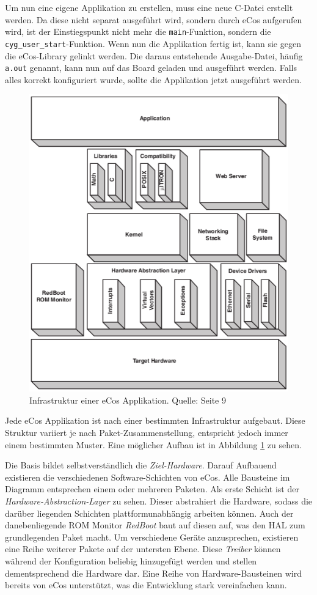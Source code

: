 \documentclass[
  a4paper,					%
  twoside,
  DIV=calc,     				%
  bibliography=totoc,
  cleardoublepage=empty,
  ngerman,     					%
  final       					%
]{scrbook}
\begin{document}
Um nun eine eigene Applikation zu erstellen, muss eine neue C-Datei erstellt werden. Da diese nicht separat ausgeführt wird, sondern durch eCos aufgerufen wird, ist der Einstiegspunkt nicht mehr die \texttt{main}-Funktion, sondern die \texttt{cyg\_user\_start}-Funktion. Wenn nun die Applikation fertig ist, kann sie gegen die eCos-Library gelinkt werden. Die daraus entstehende Ausgabe-Datei, häufig \texttt{a.out} genannt, kann nun auf das Board geladen und ausgeführt werden. Falls alles korrekt konfiguriert wurde, sollte die Applikation jetzt ausgeführt werden.

\begin{figure}
\includegraphics[width=12cm]{infra}
\caption{Infrastruktur einer eCos Applikation. Quelle:\cite{ecos_book} Seite 9}
\label{fig:infra}
\end{figure}

Jede eCos Applikation ist nach einer bestimmten Infrastruktur aufgebaut. Diese Struktur variiert je nach Paket-Zusammenstellung, entspricht jedoch immer einem bestimmten Muster. Eine möglicher Aufbau ist in Abbildung \ref{fig:infra} zu sehen.

Die Basis bildet selbstverständlich die \emph{Ziel-Hardware}. Darauf Aufbauend existieren die verschiedenen Software-Schichten von eCos. Alle Bausteine im Diagramm entsprechen einem oder mehreren Paketen. Als erste Schicht ist der \emph{Hardware-Abstraction-Layer} zu sehen. Dieser abstrahiert die Hardware, sodass die darüber liegenden Schichten plattformunabhängig arbeiten können. Auch der danebenliegende ROM Monitor \emph{RedBoot} baut auf diesen auf, was den HAL zum grundlegenden Paket macht. Um verschiedene Geräte anzusprechen, existieren eine Reihe weiterer Pakete auf der untersten Ebene. Diese \emph{Treiber} können während der Konfiguration beliebig hinzugefügt werden und stellen dementsprechend die Hardware dar. Eine Reihe von Hardware-Bausteinen wird bereits von eCos unterstützt, was die Entwicklung stark vereinfachen kann.
\end{document}
